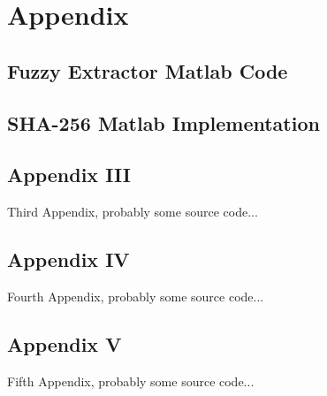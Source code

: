 
\appendix

\chapter{Appendix}

\section{Fuzzy Extractor Matlab Code}



\newpage

\section{SHA-256 Matlab Implementation}














\section{Appendix III}

Third Appendix, probably some source code...

\section{Appendix IV}

Fourth Appendix, probably some source code...

\section{Appendix V}

Fifth Appendix, probably some source code...
